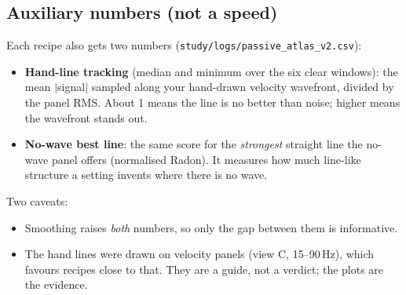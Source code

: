 \documentclass[10pt]{article}
\begin{document}
\subsection*{Auxiliary numbers (not a speed)}
Each recipe also gets two numbers (\texttt{study/logs/passive\_atlas\_v2.csv}):
\begin{itemize}
  \item \textbf{Hand-line tracking} (median and minimum over the six clear windows): the mean
    $|$signal$|$ sampled along your hand-drawn velocity wavefront, divided by the panel RMS.
    About 1 means the line is no better than noise; higher means the wavefront stands out.
  \item \textbf{No-wave best line}: the same score for the \emph{strongest} straight line the
    no-wave panel offers (normalised Radon). It measures how much line-like structure a setting
    invents where there is no wave.
\end{itemize}
Two caveats:
\begin{itemize}
  \item Smoothing raises \emph{both} numbers, so only the gap between them is informative.
  \item The hand lines were drawn on velocity panels (view C, 15--90\,Hz), which favours recipes
    close to that. They are a guide, not a verdict; the plots are the evidence.
\end{itemize}
\end{document}
